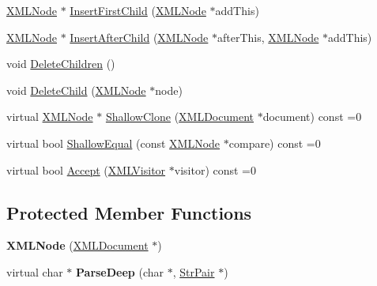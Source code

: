 \begin{DoxyCompactItemize}
\item 
\hyperlink{classtinyxml2_1_1_x_m_l_node}{X\+M\+L\+Node} $\ast$ \hyperlink{classtinyxml2_1_1_x_m_l_node_ac609a8f3ea949027f439280c640bbaf2}{Insert\+First\+Child} (\hyperlink{classtinyxml2_1_1_x_m_l_node}{X\+M\+L\+Node} $\ast$add\+This)
\item 
\hyperlink{classtinyxml2_1_1_x_m_l_node}{X\+M\+L\+Node} $\ast$ \hyperlink{classtinyxml2_1_1_x_m_l_node_a9275138a1b8dd5d8e2c26789bdc23ac8}{Insert\+After\+Child} (\hyperlink{classtinyxml2_1_1_x_m_l_node}{X\+M\+L\+Node} $\ast$after\+This, \hyperlink{classtinyxml2_1_1_x_m_l_node}{X\+M\+L\+Node} $\ast$add\+This)
\item 
void \hyperlink{classtinyxml2_1_1_x_m_l_node_a0360085cc54df5bff85d5c5da13afdce}{Delete\+Children} ()
\item 
void \hyperlink{classtinyxml2_1_1_x_m_l_node_a363b6edbd6ebd55f8387d2b89f2b0921}{Delete\+Child} (\hyperlink{classtinyxml2_1_1_x_m_l_node}{X\+M\+L\+Node} $\ast$node)
\item 
virtual \hyperlink{classtinyxml2_1_1_x_m_l_node}{X\+M\+L\+Node} $\ast$ \hyperlink{classtinyxml2_1_1_x_m_l_node_a83e3524e2ecea25eeab630c7ab113627}{Shallow\+Clone} (\hyperlink{classtinyxml2_1_1_x_m_l_document}{X\+M\+L\+Document} $\ast$document) const  =0
\item 
virtual bool \hyperlink{classtinyxml2_1_1_x_m_l_node_ac50408e91e095237f45716092ac2bddc}{Shallow\+Equal} (const \hyperlink{classtinyxml2_1_1_x_m_l_node}{X\+M\+L\+Node} $\ast$compare) const  =0
\item 
virtual bool \hyperlink{classtinyxml2_1_1_x_m_l_node_a366ad0e9b9ae8d1b18c00f903994b7a9}{Accept} (\hyperlink{classtinyxml2_1_1_x_m_l_visitor}{X\+M\+L\+Visitor} $\ast$visitor) const  =0
\end{DoxyCompactItemize}
\subsection*{Protected Member Functions}
\begin{DoxyCompactItemize}
\item 
{\bfseries X\+M\+L\+Node} (\hyperlink{classtinyxml2_1_1_x_m_l_document}{X\+M\+L\+Document} $\ast$)\hypertarget{classtinyxml2_1_1_x_m_l_node_a29868df6ca383d574f584dfdd15105b6}{}\label{classtinyxml2_1_1_x_m_l_node_a29868df6ca383d574f584dfdd15105b6}

\item 
virtual char $\ast$ {\bfseries Parse\+Deep} (char $\ast$, \hyperlink{classtinyxml2_1_1_str_pair}{Str\+Pair} $\ast$)\hypertarget{classtinyxml2_1_1_x_m_l_node_a7610d0f603e8b603d2078521811a23c1}{}\label{classtinyxml2_1_1_x_m_l_node_a7610d0f603e8b603d2078521811a23c1}

\end{DoxyCompactItemize}

